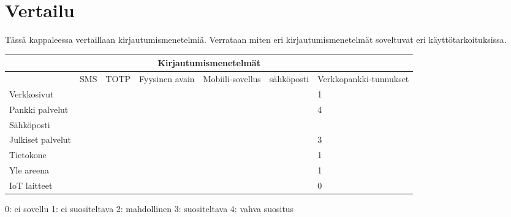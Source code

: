 \chapter{Vertailu\label{vertailu}}

Tässä kappaleessa vertaillaan kirjautumismenetelmiä. Verrataan miten eri kirjautumismenetelmät soveltuvat eri käyttötarkoituksissa.

\begin{tabular}{ |p{3cm}|p{1cm}|p{}|p{}|p{}|p{2cm}|p{}|  }
 \hline
 \multicolumn{7}{|c|}{ Kirjautumismenetelmät} \\
 \hline
 & SMS & TOTP &Fyysinen avain & Mobiili-sovellus & sähköposti & Verkkopankki-tunnukset\\
 \hline
 Verkkosivut&  &  &  &  &  &  1\\
 Pankki palvelut&  &  &  &  &  &  4\\
 Sähköposti&  &  &  &  &  &  \\
 Julkiset palvelut&  &  &  &  &  &  3\\
 Tietokone&  &  &  &  &  &  1\\
 Yle areena&  &  &  &  &  &  1\\
 IoT laitteet&  &  &  &  &  &  0\\
 \hline
\end{tabular}

0: ei sovellu
1: ei suositeltava
2: mahdollinen
3: suositeltava
4: vahva suositus
